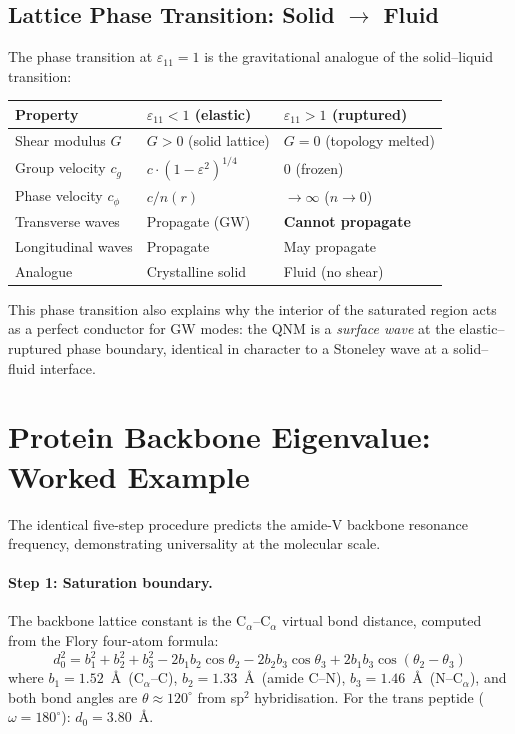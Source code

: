 \subsection{Lattice Phase Transition: Solid $\to$ Fluid}

The phase transition at $\varepsilon_{11} = 1$ is the gravitational analogue of the solid--liquid transition:

\begin{center}
\renewcommand{\arraystretch}{1.3}
\begin{tabular}{l l l}
\toprule
\textbf{Property} & \textbf{$\varepsilon_{11} < 1$ (elastic)} & \textbf{$\varepsilon_{11} > 1$ (ruptured)} \\
\midrule
Shear modulus $G$ & $G > 0$ (solid lattice) & $G = 0$ (topology melted) \\
Group velocity $c_g$ & $c \cdot (1 - \varepsilon^2)^{1/4}$ & 0 (frozen) \\
Phase velocity $c_\phi$ & $c / n(r)$ & $\to \infty$ ($n \to 0$) \\
Transverse waves & Propagate (GW) & \textbf{Cannot propagate} \\
Longitudinal waves & Propagate & May propagate \\
Analogue & Crystalline solid & Fluid (no shear) \\
\bottomrule
\end{tabular}
\end{center}

\noindent This phase transition also explains why the interior of the saturated region acts as a perfect conductor for GW modes: the QNM is a \textit{surface wave} at the elastic--ruptured phase boundary, identical in character to a Stoneley wave at a solid--fluid interface.


\section{Protein Backbone Eigenvalue: Worked Example}
\label{sec:protein_eigenvalue}

The identical five-step procedure predicts the amide-V backbone resonance frequency, demonstrating universality at the molecular scale.

\paragraph{Step 1: Saturation boundary.}
The backbone lattice constant is the C$_\alpha$--C$_\alpha$ virtual bond distance, computed from the Flory four-atom formula:
\begin{equation}
    d_0^2 = b_1^2 + b_2^2 + b_3^2 - 2b_1 b_2 \cos\theta_2 - 2b_2 b_3 \cos\theta_3 + 2b_1 b_3 \cos(\theta_2 - \theta_3)
    \label{eq:flory}
\end{equation}
where $b_1 = 1.52$~\AA\ (C$_\alpha$--C), $b_2 = 1.33$~\AA\ (amide C--N), $b_3 = 1.46$~\AA\ (N--C$_\alpha$), and both bond angles are $\theta \approx 120^\circ$ from sp$^2$ hybridisation. For the trans peptide ($\omega = 180^\circ$): $d_0 = 3.80$~\AA.

